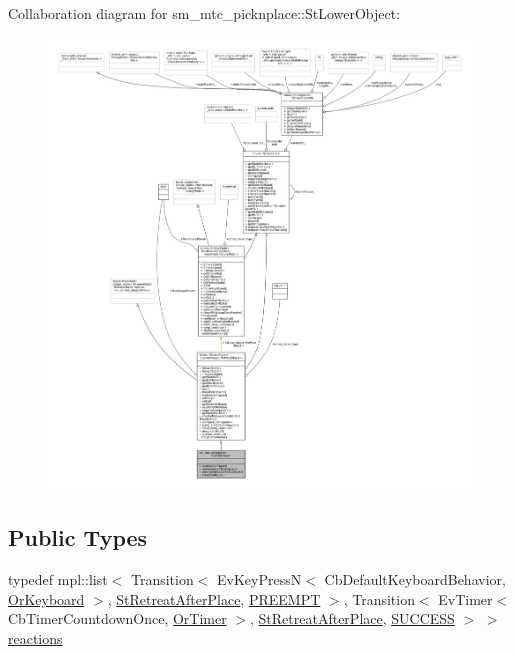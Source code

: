 Collaboration diagram for sm\+\_\+mtc\+\_\+picknplace\+:\+:St\+Lower\+Object\+:
\nopagebreak
\begin{figure}[H]
\begin{center}
\leavevmode
\includegraphics[width=350pt]{structsm__mtc__picknplace_1_1StLowerObject__coll__graph}
\end{center}
\end{figure}
\subsection*{Public Types}
\begin{DoxyCompactItemize}
\item 
typedef mpl\+::list$<$ Transition$<$ Ev\+Key\+PressN$<$ Cb\+Default\+Keyboard\+Behavior, \hyperlink{classsm__mtc__picknplace_1_1OrKeyboard}{Or\+Keyboard} $>$, \hyperlink{structsm__mtc__picknplace_1_1StRetreatAfterPlace}{St\+Retreat\+After\+Place}, \hyperlink{classPREEMPT}{P\+R\+E\+E\+M\+PT} $>$, Transition$<$ Ev\+Timer$<$ Cb\+Timer\+Countdown\+Once, \hyperlink{classsm__mtc__picknplace_1_1OrTimer}{Or\+Timer} $>$, \hyperlink{structsm__mtc__picknplace_1_1StRetreatAfterPlace}{St\+Retreat\+After\+Place}, \hyperlink{classSUCCESS}{S\+U\+C\+C\+E\+SS} $>$ $>$ \hyperlink{structsm__mtc__picknplace_1_1StLowerObject_a82883e4de896be1fbae56dbe2c76528b}{reactions}
\end{DoxyCompactItemize}
